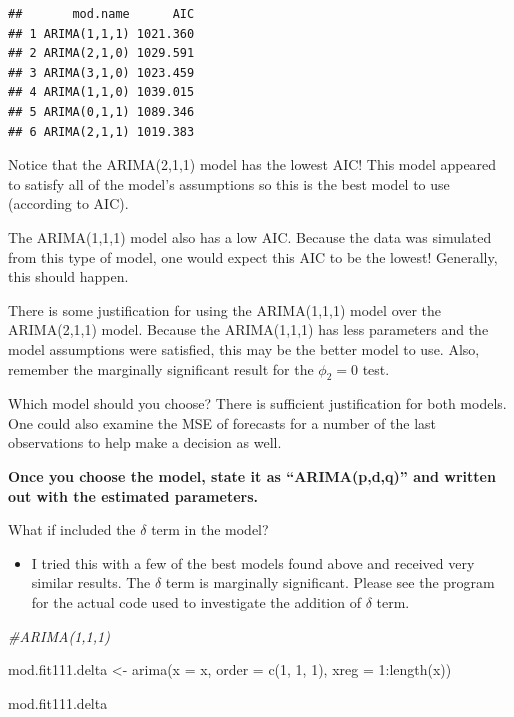 \documentclass[
]{book}
\newenvironment{Shaded}{\begin{snugshade}}{\end{snugshade}}
\newcommand{\AttributeTok}[1]{\textcolor[rgb]{0.77,0.63,0.00}{#1}}
\newcommand{\CommentTok}[1]{\textcolor[rgb]{0.56,0.35,0.01}{\textit{#1}}}
\newcommand{\DecValTok}[1]{\textcolor[rgb]{0.00,0.00,0.81}{#1}}
\newcommand{\FunctionTok}[1]{\textcolor[rgb]{0.00,0.00,0.00}{#1}}
\newcommand{\NormalTok}[1]{#1}
\newcommand{\OtherTok}[1]{\textcolor[rgb]{0.56,0.35,0.01}{#1}}
\newcommand{\SpecialCharTok}[1]{\textcolor[rgb]{0.00,0.00,0.00}{#1}}
\providecommand{\tightlist}{%
  \setlength{\itemsep}{0pt}\setlength{\parskip}{0pt}}
\theoremstyle{definition}
\theoremstyle{definition}
\theoremstyle{definition}
\theoremstyle{definition}
\theoremstyle{remark}
\begin{document}
\begin{verbatim}
##       mod.name      AIC
## 1 ARIMA(1,1,1) 1021.360
## 2 ARIMA(2,1,0) 1029.591
## 3 ARIMA(3,1,0) 1023.459
## 4 ARIMA(1,1,0) 1039.015
## 5 ARIMA(0,1,1) 1089.346
## 6 ARIMA(2,1,1) 1019.383
\end{verbatim}

Notice that the ARIMA(2,1,1) model has the lowest AIC! This model appeared to satisfy all of the model's assumptions so this is the best model to use (according to AIC).

The ARIMA(1,1,1) model also has a low AIC. Because the data was simulated from this type of model, one would expect this AIC to be the lowest! Generally, this should happen.

There is some justification for using the ARIMA(1,1,1) model over the ARIMA(2,1,1) model. Because the ARIMA(1,1,1) has less parameters and the model assumptions were satisfied, this may be the better model to use. Also, remember the marginally significant result for the \(\phi_2 = 0\) test.

Which model should you choose? There is sufficient justification for both models. One could also examine the MSE of forecasts for a number of the last observations to help make a decision as well.

\textbf{Once you choose the model, state it as ``ARIMA(p,d,q)'' and written out with the estimated parameters.}

What if included the \(\delta\) term in the model?

\begin{itemize}
\tightlist
\item
  I tried this with a few of the best models found above and received very similar results. The \(\delta\) term is marginally significant. Please see the program for the actual code used to investigate the addition of \(\delta\) term.
\end{itemize}

\begin{Shaded}
\begin{Highlighting}[]
\CommentTok{\#ARIMA(1,1,1)}

\NormalTok{mod.fit111.delta }\OtherTok{\textless{}{-}} \FunctionTok{arima}\NormalTok{(}\AttributeTok{x =}\NormalTok{ x, }\AttributeTok{order =} \FunctionTok{c}\NormalTok{(}\DecValTok{1}\NormalTok{, }\DecValTok{1}\NormalTok{, }\DecValTok{1}\NormalTok{), }\AttributeTok{xreg =} \DecValTok{1}\SpecialCharTok{:}\FunctionTok{length}\NormalTok{(x))}
  
\NormalTok{mod.fit111.delta}
\end{Highlighting}
\end{Shaded}
\end{document}
